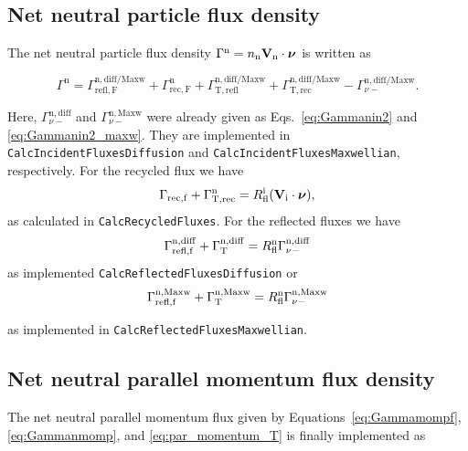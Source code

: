 \subsection{Net neutral particle flux density}

\noindent The net neutral particle flux density  $\Gamma^{\mathrm{n}} = n_{\mathrm{n}} {\bf V}_{\mathrm{n}} \cdot {\boldsymbol \nu}_{}$ is written as

\begin{equation}
\Gamma^{\mathrm{n}} = \Gamma_{\mathrm{refl},\mathrm{F}}^{\mathrm{n,diff/Maxw}} + \Gamma_{\mathrm{rec},\mathrm{F}}^{\mathrm{n}} + \Gamma_{\mathrm{T,refl}}^{\mathrm{n,diff/Maxw}} +
\Gamma_{\mathrm{T,rec}}^{\mathrm{n,diff/Maxw}} - \Gamma_{\nu-}^{\mathrm{n,diff/Maxw}}.
\end{equation}\label{eq:net_particle_flux}

Here, $\Gamma_{\nu-}^{\mathrm{n,diff}}$ and $\Gamma_{\nu-}^{\mathrm{n,Maxw}}$ were already given as Eqs.~\eqref{eq:Gammanin2} and \eqref{eq:Gammanin2_maxw}. They are implemented in \texttt{CalcIncidentFluxesDiffusion} and \texttt{CalcIncidentFluxesMaxwellian}, respectively. For the recycled flux we have
\begin{equation}
\Gamma_{\mathrm{rec},\mathrm{f}} + \Gamma_{\mathrm{T,rec}}^{\mathrm{n}} = R^{\mathrm{i}}_\mathrm{fl} ({\bf V}_{\mathrm{i}} \cdot \boldsymbol{\nu}),
\end{equation}
as calculated in \texttt{CalcRecycledFluxes}. For the reflected fluxes we have
\begin{equation}
    \Gamma_{\mathrm{refl},\mathrm{f}}^{\mathrm{n,diff}} + \Gamma_{\mathrm{T}}^{\mathrm{n,diff}} = R^{\mathrm{n}}_\mathrm{fl} \Gamma_{\nu-}^{\mathrm{n,diff}}
\end{equation}
as implemented \texttt{CalcReflectedFluxesDiffusion} or
\begin{equation}
        \Gamma_{\mathrm{refl},\mathrm{f}}^{\mathrm{n,Maxw}} +
        \Gamma_{\mathrm{T}}^{\mathrm{n,Maxw}} =
        R^{\mathrm{n}}_\mathrm{fl} \Gamma_{\nu-}^{\mathrm{n,Maxw}}
\end{equation}

\noindent as implemented in \texttt{CalcReflectedFluxesMaxwellian}.

\subsection{Net neutral parallel momentum flux density}

The net neutral parallel momentum flux given by Equations~\eqref{eq:Gammamompf}, \eqref{eq:Gammanmomp}, and \eqref{eq:par_momentum_T} is finally implemented as

